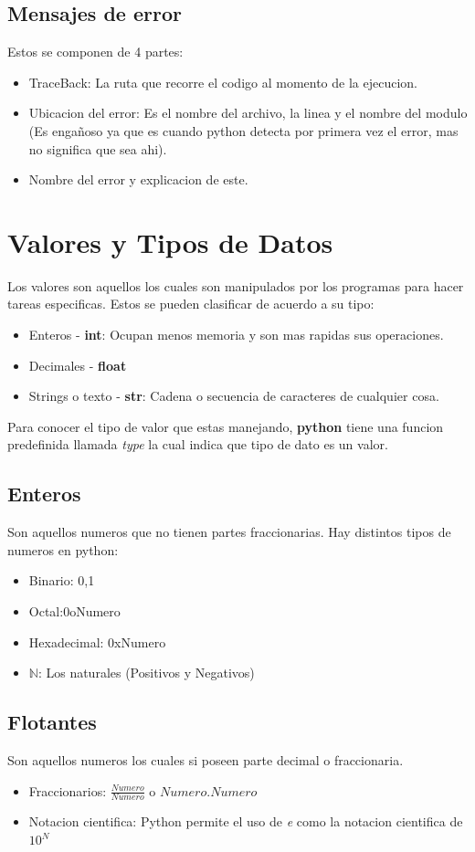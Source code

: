 \documentclass{article}
\begin{document}
\subsection{Mensajes de error}
Estos se componen  de 4 partes: 
\begin{itemize}
    \item TraceBack: La ruta que recorre el codigo al momento de la ejecucion.
    \item Ubicacion del error: Es el nombre del archivo, la linea y el nombre del modulo (Es engañoso ya que es cuando python detecta por primera vez el error, mas no significa que sea ahi). 
    \item Nombre del error y explicacion de este.
\end{itemize}
\section{Valores y Tipos de Datos}
Los valores son aquellos los cuales son manipulados por los programas para hacer tareas especificas. Estos se pueden clasificar de acuerdo a su tipo:
\begin{itemize}
    \item Enteros - \textbf{int}: Ocupan menos memoria y son mas rapidas sus operaciones.
    \item Decimales - \textbf{float}
    \item Strings o texto - \textbf{str}: Cadena o secuencia de caracteres de cualquier cosa.
\end{itemize}
Para conocer el tipo de valor que estas manejando, \textbf{python} tiene una funcion predefinida llamada \textit{type} la cual indica que tipo de dato es un valor. 
\subsection{Enteros}
Son aquellos numeros que no tienen partes fraccionarias. Hay distintos tipos de numeros en python:
\begin{itemize}
    \item Binario: 0,1
    \item Octal:0oNumero
    \item Hexadecimal: 0xNumero
    \item \(\mathbb{N}\): Los naturales (Positivos y Negativos)
\end{itemize}
\subsection{Flotantes}
Son aquellos numeros los cuales si poseen parte decimal o fraccionaria. 
\begin{itemize}
    \item Fraccionarios: \(\frac{Numero}{Numero}\) o \(Numero.Numero\)
    \item Notacion cientifica: Python permite el uso de \textit{e} como la notacion cientifica de \(10^N\)
\end{itemize}
\end{document}
